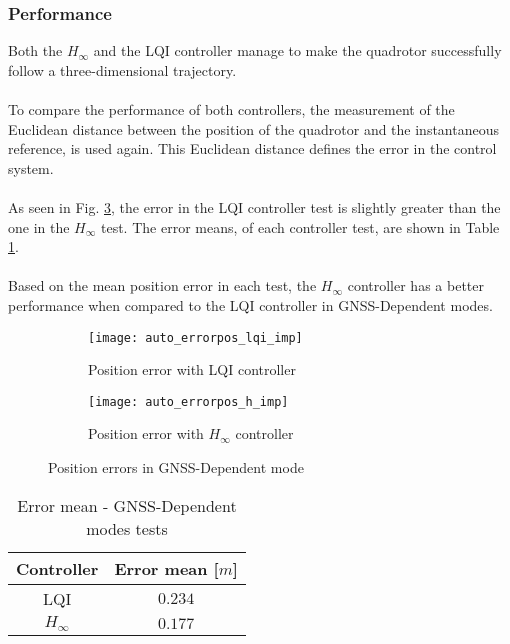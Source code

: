 \subsubsection{Performance}
Both the $H_\infty$ and the LQI controller manage to make the quadrotor successfully follow a three-dimensional trajectory.\\\\
To compare the performance of both controllers, the measurement of the Euclidean distance between the position of the quadrotor and the instantaneous reference, is used again. This Euclidean distance defines the error in the control system.
\\\\
As seen in Fig. \ref{fig:auto_errorpos_imp}, the error in the LQI controller test is slightly greater than the one in the $H_\infty$ test. The error means, of each controller test, are shown in Table \ref{tb:error_mean}.
\\\\
Based on the mean position error in each test, the $H_\infty$ controller has a better performance when compared to the LQI controller in GNSS-Dependent modes.
\begin{figure}[H]
\begin{subfigure}{.5\linewidth}
\centering
\texttt{[image: auto\_errorpos\_lqi\_imp]}
\caption{Position error with LQI controller}
\label{fig:auto_errorpos_lqi_imp}
\end{subfigure}%
\begin{subfigure}{.5\linewidth}
\centering
\texttt{[image: auto\_errorpos\_h\_imp]}
\caption{Position error with $H_\infty$ controller}
\label{fig:auto_errorpos_h_imp}
\end{subfigure}
\caption{Position errors in GNSS-Dependent mode}
\label{fig:auto_errorpos_imp}
\end{figure}
\begin{table}[H]
\small
\begin{center}
\caption{Error mean - GNSS-Dependent modes tests}\label{tb:error_mean}
\begin{tabular}{c|c}\hline
\rule{0pt}{3ex} Controller & Error mean [$m$] \\\hline\hline
\rule{0pt}{3ex} 
LQI  & $0.234$ \\[3px] \hline\rule{0pt}{3ex}
$H_\infty$ & $0.177$ \\[3px] \hline\hline
\end{tabular}
\end{center}
\end{table}


